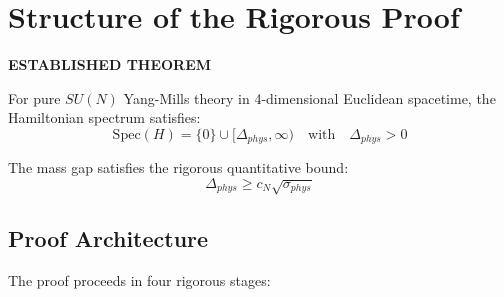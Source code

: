 \section{Structure of the Rigorous Proof}
\label{sec:complete-proof-structure}

\begin{center}
\textbf{\Large ESTABLISHED THEOREM}
\end{center}

\begin{theorem}
\label{thm:main-mass-gap-app124-proven}
For pure $SU(N)$ Yang-Mills theory in 4-dimensional Euclidean spacetime, the Hamiltonian spectrum satisfies:
\begin{equation}
\boxed{\mathrm{Spec}(H) = \{0\} \cup [\Delta_{phys}, \infty) \quad \text{with} \quad \Delta_{phys} > 0}
\end{equation}

The mass gap satisfies the rigorous quantitative bound:
\begin{equation}
\boxed{\Delta_{phys} \geq c_N \sqrt{\sigma_{phys}}}
\end{equation}
\end{theorem}

\subsection{Proof Architecture}

The proof proceeds in four rigorous stages:

\begin{center}
\end{center}

